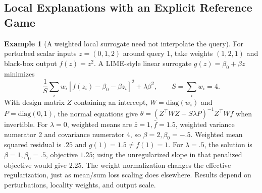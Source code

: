 \documentclass[11pt,twoside]{article}
\numberwithin{equation}{section}
\theoremstyle{plain}
\theoremstyle{definition}
\newtheorem{example}[theorem]{Example}
\theoremstyle{remark}
\begin{document}
\subsection{Local Explanations with an Explicit Reference Game}
\label{sec:explanations-worked}
\begin{example}[A weighted local surrogate need not interpolate the query]
For perturbed scalar inputs $z=(0,1,2)$ around query 1, take weights $(1,2,1)$
and black-box output $f(z)=z^2$. A LIME-style linear surrogate
$g(z)=\beta_0+\beta z$ minimizes
\[
\frac1S\sum_iw_i[f(z_i)-\beta_0-\beta z_i]^2+\lambda\beta^2,
\qquad S=\sum_iw_i=4.
\]
With design matrix $Z$ containing an intercept, $W=\mathrm{diag}(w_i)$ and
$P=\mathrm{diag}(0,1)$, the normal equations give
$\theta=(Z^\top WZ+S\lambda P)^{-1}Z^\top Wf$ when invertible.
For $\lambda=0$, weighted means are $\bar z=1,\bar f=1.5$,
weighted variance numerator 2 and covariance numerator 4, so
$\beta=2,\beta_0=-.5$. Weighted mean squared residual is $.25$ and
$g(1)=1.5\ne f(1)=1$. For $\lambda=.5$, the solution is
$\beta=1,\beta_0=.5$, objective $1.25$; using the unregularized slope in
that penalized objective would give $2.25$. The weight normalization changes
the effective regularization, just as mean/sum loss scaling does elsewhere.
Results depend on perturbations, locality weights, and output scale.
\end{example}
\end{document}
